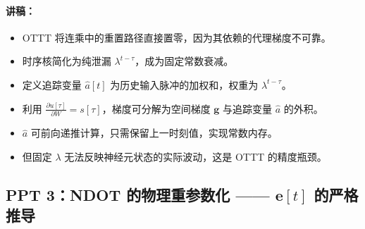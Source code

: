 \documentclass[journal,12pt,onecolumn]{IEEEtran}
\begin{document}
\paragraph{\textbf{讲稿：}}
\begin{itemize}
    \item OTTT 将连乘中的重置路径直接置零，因为其依赖的代理梯度不可靠。
    \item 时序核简化为纯泄漏 \(\lambda^{t-\tau}\)，成为固定常数衰减。
    \item 定义追踪变量 \(\hat{a}[t]\) 为历史输入脉冲的加权和，权重为 \(\lambda^{t-\tau}\)。
    \item 利用 \(\frac{\partial u[\tau]}{\partial W} = s[\tau]\)，梯度可分解为空间梯度 \(\mathbf{g}\) 与追踪变量 \(\hat{a}\) 的外积。
    \item \(\hat{a}\) 可前向递推计算，只需保留上一时刻值，实现常数内存。
    \item 但固定 \(\lambda\) 无法反映神经元状态的实际波动，这是 OTTT 的精度瓶颈。
\end{itemize}

\subsection*{PPT 3：NDOT 的物理重参数化 —— \(\mathbf{e}[t]\) 的严格推导}
\end{document}
